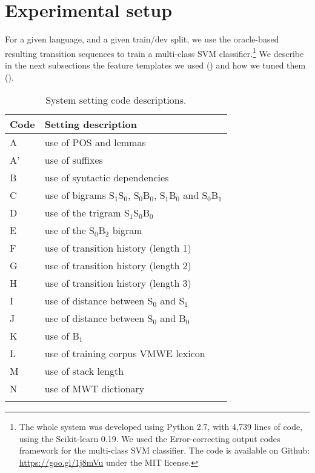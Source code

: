 \documentclass[output=paper,modfonts]{langscibook}
\begin{document}
\section{Experimental setup}
For a given language, and a given train/dev split, we use the oracle-based resulting transition sequences to train a multi-class SVM classifier.\footnote{The whole system was developed using Python 2.7, with 4,739 lines of code, using the Scikit-learn 0.19. We used the Error-correcting output codes framework for the multi-class SVM classifier. The code is available on Github: \url{https://goo.gl/1j8mVu} under the MIT license.}
We describe in the next subsections the feature templates we used () and how we tuned them (). 

\begin{table}[t]
\centering
\small
\begin{tabular}{ll}
\lsptoprule
\textbf{Code}&\textbf{Setting description}\\
\midrule
A &use of POS and lemmas\\
A' & use of suffixes\\
B &use of syntactic dependencies\\
C &use of bigrams S$_1$S$_0$, S$_0$B$_0$, S$_1$B$_0$ and S$_0$B$_1$\\
D &use of the trigram S$_1$S$_0$B$_0$ \\
E &use of the S$_0$B$_2$ bigram\\
F &use of transition history (length 1)\\
G &use of transition history (length 2)\\
H &use of transition history (length 3)\\
I &use of distance between S$_0$ and S$_1$\\
J &use of distance between S$_0$ and B$_0$\\
K &use of B$_1$\\
L &use of training corpus VMWE lexicon\\
M &use of stack length\\
N &use of MWT dictionary\\
\lspbottomrule
\end{tabular}
\caption{System setting code descriptions.}
\label{table:codes}
\end{table}
\end{document}
